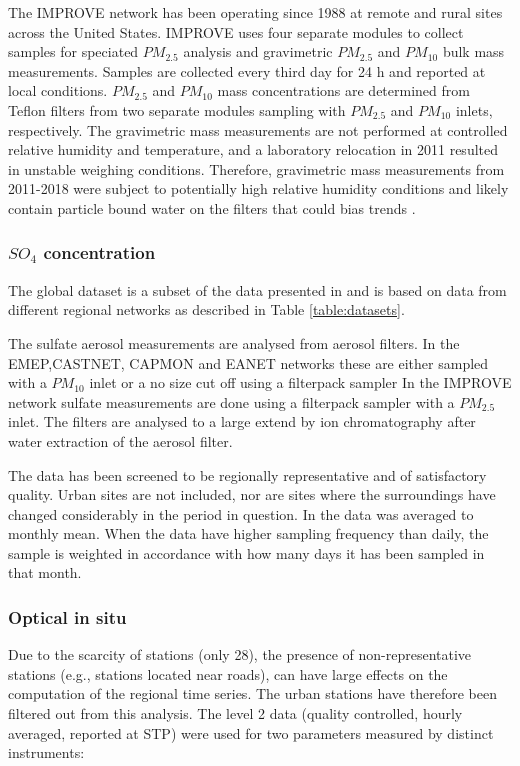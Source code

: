 \documentclass[journal abbreviation, manuscript]{copernicus}
\begin{document}
The IMPROVE network has been operating since 1988 at remote and rural sites across the United States. IMPROVE uses four separate modules to collect samples for speciated $PM_{2.5}$ analysis and gravimetric $PM_{2.5}$ and $PM_{10}$ bulk mass measurements. Samples are collected every third day for 24 h and reported at local conditions. $PM_{2.5}$ and $PM_{10}$ mass concentrations are determined from Teflon filters from two separate modules sampling with $PM_{2.5}$ and $PM_{10}$ inlets, respectively. The gravimetric mass measurements are not performed at controlled relative humidity and temperature, and a laboratory relocation in 2011 resulted in unstable weighing conditions. Therefore, gravimetric mass measurements from 2011-2018 were subject to potentially high relative humidity conditions and likely contain particle bound water on the filters that could bias trends \citep{Hand2019}.



\subsubsection{$SO_{4}$ concentration}
 The global dataset is a subset of the data presented in \cite{aas2019global} and is based on data from different regional networks as described in Table \ref{table:datasets}.

The sulfate aerosol measurements are analysed from aerosol filters. In the EMEP,CASTNET, CAPMON and EANET networks these are either sampled with a $PM_{10}$ inlet or a no size cut off using a filterpack sampler  In the IMPROVE network sulfate measurements are done using a filterpack sampler with a $PM_{2.5}$ inlet. The filters are analysed to a large extend by ion chromatography after water extraction of the aerosol filter.

The data has been screened to be regionally representative and of satisfactory quality. Urban sites are not included, nor are sites where the surroundings have changed considerably in the period in question.
In \cite{aas2019global} the data  was averaged to monthly mean.  When the data have higher sampling frequency than daily, the sample is weighted in accordance with how many days it has been sampled in that month.

\subsubsection{Optical in situ}
Due to the scarcity of stations (only 28), the presence of non-representative stations (e.g., stations located near roads), can have large effects on the computation of the regional time series. The urban stations have therefore been filtered out from this analysis. The level 2 data (quality controlled, hourly averaged, reported at STP) were used for two parameters measured by distinct instruments:
\end{document}

